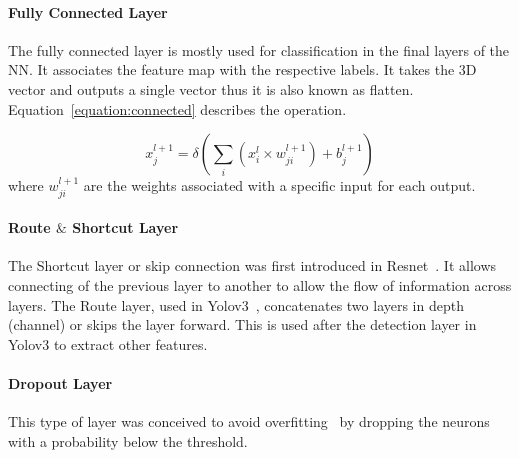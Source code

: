 \documentclass[conference]{IEEEtran}
\begin{document}
 

\paragraph{Fully Connected Layer}

The fully connected layer is mostly used for classification in the final layers
of the NN. It associates the feature map with the respective labels.  It takes the
3D vector and outputs a single vector thus it is also known as flatten.
Equation~\ref{equation:connected} describes the operation.

\begin{equation} \label{equation:connected}
     \displaystyle x_{j}^{l+1}=\delta (\sum_{i}(x_{i}^{l} \times w_{ji}^{l+1})+ b_{j}^{l+1})
\end{equation}
where $w_{ji}^{l+1}$ are the weights associated with a specific input for each output.


\paragraph{Route $\&$ Shortcut Layer}

The Shortcut layer or skip connection was first introduced in
Resnet~\cite{resnet}.  It allows connecting of the previous layer to another to
allow the flow of information across layers.  The Route layer, used in
Yolov3~\cite{yolov3}, concatenates two layers in depth (channel) or skips the
layer forward. This is used after the detection layer in Yolov3 to extract other
features.

\paragraph{Dropout Layer}

This type of layer was conceived to avoid overfitting~\cite{Dropout} by dropping
the neurons with a probability below the threshold. 
\end{document}
